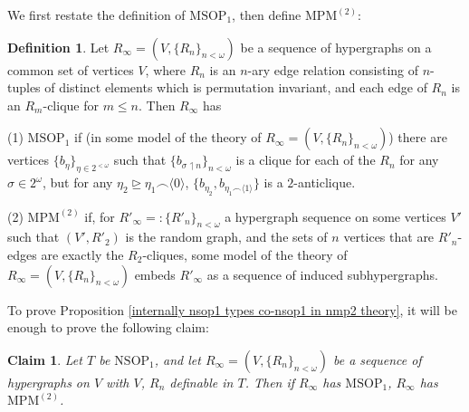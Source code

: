 \documentclass{article}
\newtheorem{claim}{Claim}
\theoremstyle{definition}
\newtheorem{definition}{Definition}
\theoremstyle{definition}
\theoremstyle{definition}
\begin{document}
We first restate the definition of $\mathrm{MSOP}_{1}$, then define $\mathrm{MPM}^{(2)}$:

\begin{definition}
        Let $R_{\infty}=(V,\{R_{n}\}_{n < \omega})$ be a sequence of hypergraphs on a common set of vertices $V$, where $R_{n}$ is an $n$-ary edge relation consisting of $n$-tuples of distinct elements which is permutation invariant, and each edge of $R_{n}$ is an $R_{m}$-clique for $m \leq n$. Then $R_{\infty}$ has


        (1)  $\mathrm{MSOP}_{1}$ if (in some model of the theory of $R_{\infty}=(V,\{R_{n}\}_{n < \omega})$) there are vertices $\{b_{\eta}\}_{\eta \in 2^{<\omega}}$ such that $\{ b_{\sigma \upharpoonleft n}\}_{n < \omega}$ is a clique for each of the $R_{n}$ for any $\sigma \in 2^{\omega}$, but for any $\eta_{2} \unrhd \eta_{1} \smallfrown \langle 0\rangle$, $\{b_{\eta_{2}},  b_{\eta_{1} \smallfrown \langle 1\rangle}\}$ is a $2$-anticlique.

        (2) $\mathrm{MPM}^{(2)}$ if, for $R'_{\infty} =: \{R'_{n}\}_{n < \omega}$ a hypergraph sequence on some vertices $V'$ such that $(V', R'_{2})$ is the random graph, and the sets of $n$ vertices that are $R'_{n}$-edges are exactly the $R_{2}$-cliques, some model of the theory of $R_{\infty}=(V,\{R_{n}\}_{n < \omega})$ embeds $R'_{\infty} $ as a sequence of induced subhypergraphs.
\end{definition}


To prove Proposition \ref{internally nsop1 types co-nsop1 in nmp2 theory}, it will be enough to prove the following claim:

\begin{claim}
    Let $T$ be $\mathrm{NSOP}_{1}$, and let $R_{\infty}=(V,\{R_{n}\}_{n < \omega})$ be a sequence of hypergraphs on $V$ with $V$, $R_{n}$ definable in $T$. Then if $R_{\infty}$ has $\mathrm{MSOP}_{1}$, $R_{\infty}$ has $\mathrm{MPM}^{(2)}$.
\end{claim}
\end{document}
